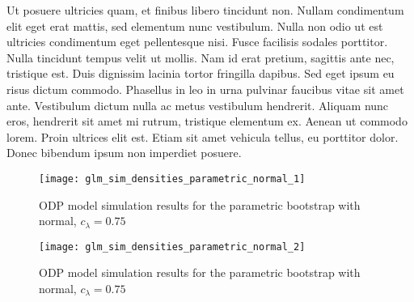\documentclass[a4paper]{book}
\begin{document}
Ut posuere ultricies quam, et finibus libero tincidunt non. Nullam condimentum elit eget erat mattis, sed elementum nunc vestibulum. Nulla non odio ut est ultricies condimentum eget pellentesque nisi. Fusce facilisis sodales porttitor. Nulla tincidunt tempus velit ut mollis. Nam id erat pretium, sagittis ante nec, tristique est. Duis dignissim lacinia tortor fringilla dapibus. Sed eget ipsum eu risus dictum commodo. Phasellus in leo in urna pulvinar faucibus vitae sit amet ante. Vestibulum dictum nulla ac metus vestibulum hendrerit. Aliquam nunc eros, hendrerit sit amet mi rutrum, tristique elementum ex. Aenean ut commodo lorem. Proin ultrices elit est. Etiam sit amet vehicula tellus, eu porttitor dolor. Donec bibendum ipsum non imperdiet posuere.




\begin{landscape}
  \begin{figure}
    \centering
    \texttt{[image: glm\_sim\_densities\_parametric\_normal\_1]}
    \caption{ODP model simulation results for the parametric bootstrap with normal, $c_\lambda = 0.75$}
    \label{fig:glm-sim-param-norm}
  \end{figure}
\end{landscape}

\begin{landscape}
  \begin{figure}
    \ContinuedFloat
    \captionsetup{list=off,format=cont}
    \centering
    \texttt{[image: glm\_sim\_densities\_parametric\_normal\_2]}
    \caption{ODP model simulation results for the parametric bootstrap with normal, $c_\lambda = 0.75$}
  \end{figure}
\end{landscape}
\end{document}
